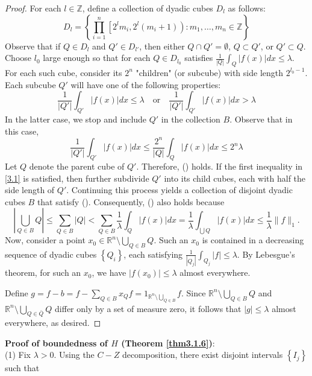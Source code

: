 \documentclass[12pt,openany]{book}
\theoremstyle{definition}
\begin{document}
\begin{proof}
For each $l \in \mathbb{Z}$, define a collection of dyadic cubes $D_l$ as follows:
$$
D_l = \left\{ \prod_{i=1}^n \left[ 2^l m_i, 2^l (m_i + 1) \right) : m_1, \ldots, m_n \in \mathbb{Z} \right\}
$$
Observe that if $Q \in D_l$ and $Q' \in D_{l'}$, then either $Q \cap Q' = \emptyset$, $Q \subset Q'$, or $Q' \subset Q$.
Choose $l_0$ large enough so that for each $Q \in D_{l_0}$ satisfies $\frac{1}{|Q|} \int_Q |f(x)| dx \leq \lambda$.
For each such cube, consider its $2^n$ "children" (or subcube) with side length $2^{l_0 - 1}$.
Each subcube $Q'$ will have one of the following properties:
\begin{equation}\label{3.1}
    \frac{1}{|Q'|} \int_{Q'} |f(x)| dx \leqslant \lambda \quad \text{or} \quad \frac{1}{|Q'|} \int_{Q'} |f(x)| dx > \lambda
\end{equation}
In the latter case, we stop and include $Q'$ in the collection $B$.
Observe that in this case,
$$
\frac{1}{|Q'|} \int_{Q'} |f(x)| dx \leqslant \frac{2^n}{|Q|} \int_Q |f(x)| dx \leqslant 2^n \lambda
$$
Let $Q$ denote the parent cube of $Q'$. Therefore, () holds. If the first inequality in \eqref{3.1} is satisfied, then further subdivide $Q'$ into its child cubes, each with half the side length of $Q'$. Continuing this process yields a collection of disjoint dyadic cubes $B$ that satisfy (). Consequently, () also holds because
$$
\left|\bigcup_{Q \in B} Q\right| \leq \sum_{Q \in B}|Q| < \sum_{Q \in B} \frac{1}{\lambda} \int_Q |f(x)| dx = \frac{1}{\lambda} \int_{\bigcup Q} |f(x)| dx \leq \frac{1}{\lambda} \|f\|_1.
$$
Now, consider a point $x_0 \in \mathbb{R}^n \setminus \bigcup_{Q \in B} Q$. Such an $x_0$ is contained in a decreasing sequence of dyadic cubes $\left\{Q_i\right\}$, each satisfying $\frac{1}{\left|Q_j\right|} \int_{Q_j} |f| \leq \lambda$.
By Lebesgue's theorem, for such an $x_0$, we have $\left|f\left(x_0\right)\right| \leq \lambda$ almost everywhere.

Define $g = f - b = f - \sum_{Q \in B} x_Q f = 1_{\mathbb{R}^n \setminus \bigcup_{Q \in B}} f$. Since $\mathbb{R}^n \setminus \bigcup_{Q \in B} Q$ and $\mathbb{R}^n \setminus \bigcup_{Q \in \bar{Q}} Q$ differ only by a set of measure zero, it follows that $|g| \leq \lambda$ almost everywhere, as desired.
\end{proof}
\noindent\textbf{Proof of boundedness of $H$ (Theorem \ref{thm3.1.6})}:\\
(1) Fix $\lambda > 0$. Using the $C-Z$ decomposition, there exist disjoint intervals $\left\{I_j\right\}$ such that
\end{document}
